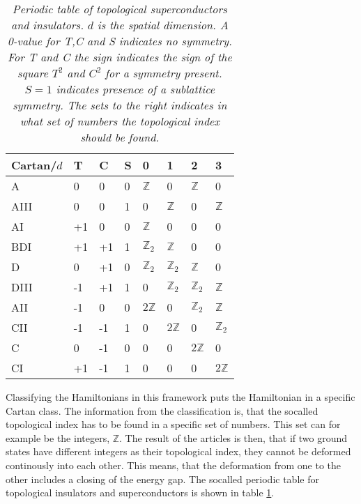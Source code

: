 \begin{table}[htb]
\centering
\caption{\textit{Periodic table of topological superconductors and insulators. $d$ is the spatial dimension. A 0-value for T,C and S indicates no symmetry. For T and C the sign indicates the sign of the square $T^2$ and $C^2$ for a symmetry present. $S=1$ indicates presence of a sublattice symmetry. The sets to the right indicates in what set of numbers the topological index should be found. }}
\begin{tabular}{|l|l l l|l l l l|}
\hline Cartan/$d$   &  T &  C & S					& 0 & 1 & 2 & 3 \\
\hline A    		&  0 &  0 & 0					& $\mathbb{Z}$ & 0 & $\mathbb{Z}$ & 0   			 \\
\hline AIII 		&  0 &  0 & 1					& 0 & $\mathbb{Z}$ & 0 & $\mathbb{Z}$   			 \\
\hline AI   		& +1 &  0 & 0					& $\mathbb{Z}$ & 0 & 0 & 0 			    			 \\
\hline BDI	       	& +1 & +1 & 1 					& $\mathbb{Z}_2$ & $\mathbb{Z}$ & 0 & 0 			 \\
\hline D	       	&  0 & +1 & 0 					& $\mathbb{Z}_2$ & $\mathbb{Z}_2$ & $\mathbb{Z}$ & 0 \\
\hline DIII	       	& -1 & +1 & 1 					& 0 & $\mathbb{Z}_2$ & $\mathbb{Z}_2$ & $\mathbb{Z}$ \\
\hline AII	       	& -1 &  0 & 0 				 	& $2\mathbb{Z}$ & 0 & $\mathbb{Z}_2$ & $\mathbb{Z}$  \\
\hline CII	       	& -1 & -1 & 1 					& 0 & $2\mathbb{Z}$ & 0 & $\mathbb{Z}_2$  			 \\
\hline C	       	&  0 & -1 & 0 					& 0 & 0 & $2\mathbb{Z}$ & 0  						 \\
\hline CI	       	& +1 & -1 & 1 					& 0 & 0 & 0 & $2\mathbb{Z}$  						 \\
\hline 
\end{tabular}
\label{tab.PeriodicTableTISC}
\end{table}

Classifying the Hamiltonians in this framework puts the Hamiltonian in a specific Cartan class. The information from the classification is, that the socalled topological index has to be found in a specific set of numbers. This set can for example be the integers, $\mathbb{Z}$. The result of the articles is then, that if two ground states have different integers as their topological index, they cannot be deformed continously into each other. This means, that the deformation from one to the other includes a closing of the energy gap. The socalled periodic table for topological insulators and superconductors is shown in table \ref{tab.PeriodicTableTISC}.



